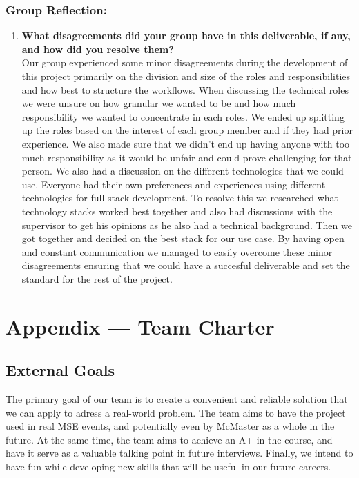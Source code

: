 \documentclass{article}
\begin{document}
\subsubsection*{Group Reflection: }
\begin{enumerate}
  \item \textbf{What disagreements did your group have in this deliverable, if any, and how did you resolve them?} \\ 
  Our group experienced some minor disagreements during the development of this project primarily on the division and size of the roles and responsibilities and how best to structure the workflows. When discussing the technical roles we were unsure on how granular we wanted to be and how much responsibility we wanted to concentrate in each roles. We ended up splitting up the roles based on the interest of each group member and if they had prior experience. We also made sure that we didn't end up having anyone with too much responsibility as it would be unfair and could prove challenging for that person. We also had a discussion on the different technologies that we could use. Everyone had their own preferences and experiences using different technologies for full-stack development. To resolve this we researched what technology stacks worked best together and also had discussions with the supervisor to get his opinions as he also had a technical background. Then we got together and decided on the best stack for our use case. By having open and constant communication we managed to easily overcome these minor disagreements ensuring that we could have a succesful deliverable and set the standard for the rest of the project.
\end{enumerate}
\newpage{}

\section*{Appendix --- Team Charter}


\subsection*{External Goals}

The primary goal of our team is to create a convenient and reliable solution that we can apply to adress a real-world problem. The team aims to have the project used in real MSE events, and potentially even by McMaster as a whole in the future. At the same time, the team aims to achieve an A+ in the course, and have it serve as a valuable talking point in future interviews. Finally, we intend to have fun while developing new skills that will be useful in our future careers.
\end{document}
